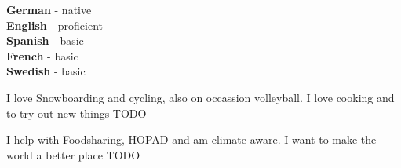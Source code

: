 \documentclass[9pt]{developercv} %
\begin{document}

\begin{minipage}[t]{0.3\textwidth}
	\vspace{-\baselineskip} %

	
	\textbf{German} - native\\
	\textbf{English} - proficient\\
	\textbf{Spanish} - basic\\
	\textbf{French} - basic\\
	\textbf{Swedish} - basic
\end{minipage}
\hfill
\begin{minipage}[t]{0.3\textwidth}
	\vspace{-\baselineskip} %
	
	
	I love Snowboarding and cycling, also on occassion volleyball. I love cooking and to try out new things TODO
\end{minipage}
\hfill
\begin{minipage}[t]{0.3\textwidth}
	\vspace{-\baselineskip} %
	
	
	I help with Foodsharing, HOPAD and am climate aware. I want to make the world a better place TODO
\end{minipage}

\end{document}
